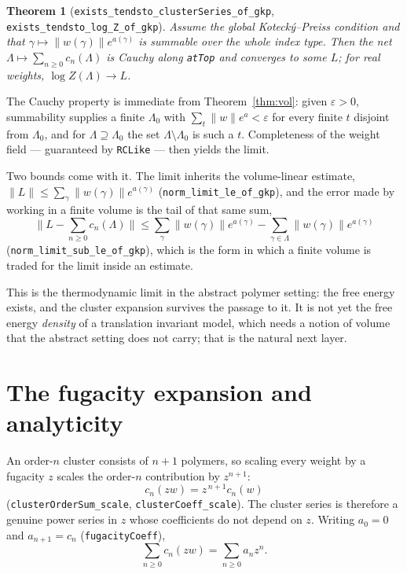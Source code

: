 \documentclass[11pt]{amsart}
\newtheorem{theorem}{Theorem}[section]
\begin{document}
\begin{theorem}[\texttt{exists\_tendsto\_clusterSeries\_of\_gkp},
\texttt{exists\_tendsto\_log\_Z\_of\_gkp}]\label{thm:limit}
Assume the global Kotecký--Preiss condition and that
$\gamma \mapsto \lVert w(\gamma)\rVert e^{a(\gamma)}$ is summable over
the whole index type. Then the net
$\Lambda \mapsto \sum_{n \ge 0} c_n(\Lambda)$ is Cauchy along
\texttt{atTop} and converges to some $L$; for real weights,
$\log Z(\Lambda) \to L$.
\end{theorem}

The Cauchy property is immediate from Theorem~\ref{thm:vol}: given
$\varepsilon > 0$, summability supplies a finite $\Lambda_0$ with
$\sum_{t} \lVert w \rVert e^{a} < \varepsilon$ for every finite $t$
disjoint from $\Lambda_0$, and for $\Lambda \supseteq \Lambda_0$ the set
$\Lambda \setminus \Lambda_0$ is such a $t$. Completeness of the weight
field --- guaranteed by \texttt{RCLike} --- then yields the limit.

Two bounds come with it. The limit inherits the volume-linear estimate,
$\lVert L \rVert \le \sum_{\gamma} \lVert w(\gamma)\rVert e^{a(\gamma)}$
(\texttt{norm\_limit\_le\_of\_gkp}), and the error made by working in a
finite volume is the tail of that same sum,
\[
  \lVert L - \textstyle\sum_{n \ge 0} c_n(\Lambda) \rVert
  \le \sum_{\gamma} \lVert w(\gamma)\rVert e^{a(\gamma)}
    - \sum_{\gamma \in \Lambda} \lVert w(\gamma)\rVert e^{a(\gamma)}
\]
(\texttt{norm\_limit\_sub\_le\_of\_gkp}), which is the form in which a
finite volume is traded for the limit inside an estimate.

This is the thermodynamic limit in the abstract polymer setting: the
free energy exists, and the cluster expansion survives the passage to
it. It is not yet the free energy \emph{density} of a translation
invariant model, which needs a notion of volume that the abstract
setting does not carry; that is the natural next layer.

\section{The fugacity expansion and analyticity}\label{sec:fugacity}

An order-$n$ cluster consists of $n+1$ polymers, so scaling every weight
by a fugacity $z$ scales the order-$n$ contribution by $z^{n+1}$:
\[
  c_n(z w) = z^{\,n+1} c_n(w)
\]
(\texttt{clusterOrderSum\_scale}, \texttt{clusterCoeff\_scale}). The
cluster series is therefore a genuine power series in $z$ whose
coefficients do not depend on $z$. Writing $a_0 = 0$ and
$a_{n+1} = c_n$ (\texttt{fugacityCoeff}),
\[
  \sum_{n \ge 0} c_n(z w) = \sum_{n \ge 0} a_n z^{n} .
\]
\end{document}

